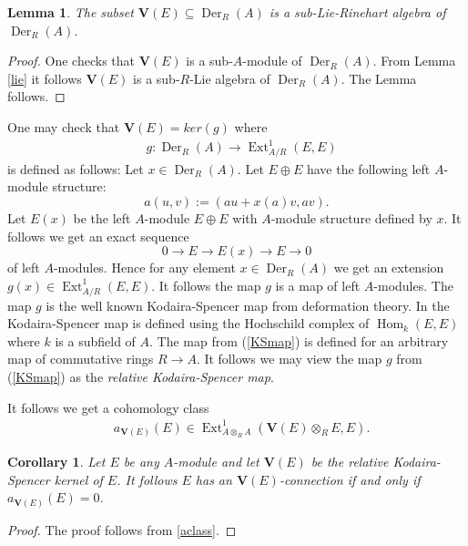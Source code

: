 \documentclass{amsart}
\theoremstyle{plain}
\newtheorem{corollary}[theorem]{Corollary}
\newtheorem{lemma}[theorem]{Lemma}
\theoremstyle{definition}
\theoremstyle{remark}
\numberwithin{equation}{theorem}
\begin{document}
\begin{lemma} The subset $\mathbf{V}(E)\subseteq {\operatorname{Der} }_{R}({A})$ is a sub-Lie-Rinehart algebra of ${\operatorname{Der} }_{R}({A})$.
\end{lemma}
\begin{proof} One checks that $\mathbf{V}(E)$ is a sub-${A}$-module of ${\operatorname{Der} }_{R}({A})$. From Lemma \ref{lie} it follows
$\mathbf{V}(E)$ is a sub-${R}$-Lie algebra of ${\operatorname{Der} }_{R}({A})$. The Lemma follows.
\end{proof}
One may check that $\mathbf{V}(E)=ker(g)$ where
\begin{align}
&\label{KSmap} g:{\operatorname{Der} }_{R}({A})\rightarrow {\operatorname{Ext} }^1_{{A}/{R}}(E,E)
\end{align}
is defined as follows:
Let $x\in {\operatorname{Der} }_{R}({A})$. Let $E\oplus E$ have the following left ${A}$-module structure:
\[ a(u,v):=(au+x(a)v,av).\]
Let $E(x)$ be the left ${A}$-module $E\oplus E$ with ${A}$-module structure defined by $x$.
It follows we get an exact sequence
\[ 0\rightarrow E \rightarrow E(x) \rightarrow E \rightarrow 0\]
of left ${A}$-modules. Hence for any element $x\in {\operatorname{Der} }_{R}({A})$ we get an extension $g(x)\in {\operatorname{Ext} }^1_{{A}/{R}}(E,E)$.
It follows the map $g$ is a map of left ${A}$-modules.
The map $g$ is the well known Kodaira-Spencer map from deformation theory. In \cite{maa1} the Kodaira-Spencer map
is defined using the Hochschild complex of ${\operatorname{Hom} }_k(E,E)$ where $k$ is a subfield of ${A}$. The map from (\ref{KSmap})
is defined for an arbitrary map of commutative rings ${R}\rightarrow {A}$. It follows we may view the map
$g$ from (\ref{KSmap}) as the \emph{relative Kodaira-Spencer map}.

It follows we get a cohomology class
\begin{align}
&\label{ksclass}  a_{\mathbf{V}(E)}(E)\in {\operatorname{Ext} }^1_{{A}\otimes_{R} {A}}(\mathbf{V}(E)\otimes_{R} E, E).
\end{align}

\begin{corollary} Let $E$ be any ${A}$-module and let $\mathbf{V}(E)$ be the relative Kodaira-Spencer kernel of $E$.
It follows $E$ has an $\mathbf{V}(E)$-connection if and only if $a_{\mathbf{V}(E)}(E)=0$.
\end{corollary}
\begin{proof} The proof follows from \ref{aclass}.
\end{proof}
\end{document}
